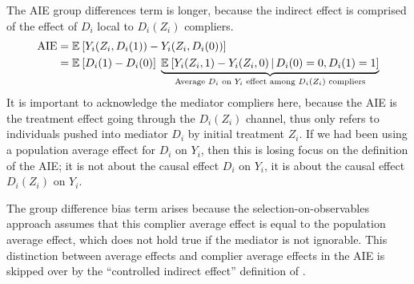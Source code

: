 The AIE group differences term is longer, because the indirect effect is comprised of the effect of $D_i$ local to $D_i(Z_i)$ compliers.
\begin{align*}
    \text{AIE}
    &= \mathbb{E}_{} \left[ Y_i(Z_i, D_i(1)) - Y_i(Z_i, D_i(0)) \right] \\
    &= \mathbb{E}_{} \left[ D_i(1) - D_i(0) \right] \; 
        \underbrace{\mathbb{E}_{} \left[ Y_i(Z_i, 1) - Y_i(Z_i, 0) \, \middle\vert \, D_i(0)=0, D_i(1)=1 \right]}_{
            \text{Average $D_i$ on $Y_i$ effect among $D_i(Z_i)$ compliers}
        }
\end{align*}
It is important to acknowledge the mediator compliers here, because the AIE is the treatment effect going through the $D_i(Z_i)$ channel, thus only refers to individuals pushed into mediator $D_i$ by initial treatment $Z_i$.
If we had been using a population average effect for $D_i$ on $Y_i$, then this is losing focus on the definition of the AIE; it is not about the causal effect $D_i$ on $Y_i$, it is about the causal effect $D_i(Z_i)$ on $Y_i$.

The group difference bias term arises because the selection-on-observables approach assumes that this complier average effect is equal to the population average effect, which does not hold true if the mediator is not ignorable.
This distinction between average effects and complier average effects in the AIE is skipped over by the ``controlled indirect effect'' definition of \cite{pearl2003direct}.
